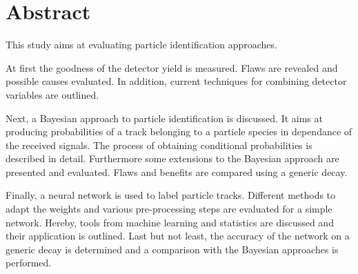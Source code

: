 \chapter*{Abstract}

This study aims at evaluating particle identification approaches.

At first the goodness of the detector yield is measured. Flaws are revealed and possible causes evaluated. In addition, current techniques for combining detector variables are outlined.

Next, a Bayesian approach to particle identification is discussed. It aims at producing probabilities of a track belonging to a particle species in dependance of the received signals. The process of obtaining conditional probabilities is described in detail. Furthermore some extensions to the Bayesian approach are presented and evaluated. Flaws and benefits are compared using a generic decay.

Finally, a neural network is used to label particle tracks. Different methods to adapt the weights and various pre-processing steps are evaluated for a simple network. Hereby, tools from machine learning and statistics are discussed and their application is outlined. Last but not least, the accuracy of the network on a generic decay is determined and a comparison with the Bayesian approaches is performed.
